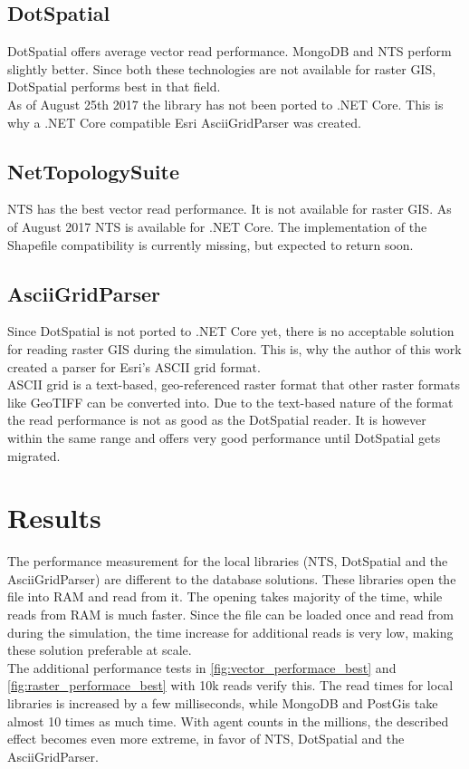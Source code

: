 \subsection{DotSpatial}
DotSpatial offers average vector read performance. MongoDB and NTS perform slightly better. Since both these technologies are not available for raster GIS, DotSpatial performs best in that field.\\
As of August 25th 2017 the library has not been ported to .NET Core. This is why a .NET Core compatible Esri AsciiGridParser was created.\\


\subsection{NetTopologySuite}
NTS has the best vector read performance. It is not available for raster GIS. As of August 2017 NTS is available for .NET Core. The implementation of the Shapefile compatibility is currently missing, but expected to return soon.\\


\subsection{AsciiGridParser}
Since DotSpatial is not ported to .NET Core yet, there is no acceptable solution for reading raster GIS during the simulation. This is, why the author of this work created a parser for Esri's ASCII grid format.\\
ASCII grid is a text-based, geo-referenced raster format that other raster formats like GeoTIFF can be converted into. Due to the text-based nature of the format the read performance is not as good as the DotSpatial reader. It is however within the same range and offers very good performance until DotSpatial gets migrated.



\section{Results}
The performance measurement for the local libraries (NTS, DotSpatial and the AsciiGridParser) are different to the database solutions. These libraries open the file into RAM and read from it. The opening takes majority of the time, while reads from RAM is much faster. Since the file can be loaded once and read from during the simulation, the time increase for additional reads is very low, making these solution preferable at scale.\\
The additional performance tests in \ref{fig:vector_performace_best} and \ref{fig:raster_performace_best} with 10k reads verify this. The read times for local libraries is increased by a few milliseconds, while MongoDB and PostGis take almost 10 times as much time. With agent counts in the millions, the described effect becomes even more extreme, in favor of NTS, DotSpatial and the AsciiGridParser.

